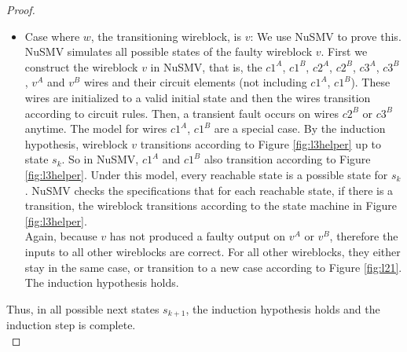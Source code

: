 \documentclass[12pt]{report}
\begin{document}
\begin{proof}
\begin{itemize}
\item Case where $w$, the transitioning wireblock, is $v$:  We use NuSMV to prove this.  NuSMV simulates all possible states of the faulty wireblock $v$.  First we construct the wireblock $v$ in NuSMV, that is, the $c1^A$, $c1^B$, $c2^A$, $c2^B$, $c3^A$, $c3^B$, $v^A$ and $v^B$ wires and their circuit elements (not including $c1^A$, $c1^B$).  These wires are initialized to a valid initial state and then the wires transition according to circuit rules.  Then, a transient fault occurs on wires $c2^B$ or $c3^B$ anytime.  The model for wires $c1^A$, $c1^B$ are a special case.  By the induction hypothesis, wireblock $v$ transitions according to Figure \ref{fig:l3helper} up to state $s_k$.  So in NuSMV, $c1^A$ and $c1^B$ also transition according to Figure \ref{fig:l3helper}.  Under this model, every reachable state is a possible state for $s_k$.
 NuSMV checks the specifications that for each reachable state, if there is a transition, the wireblock transitions according to the state machine in Figure \ref{fig:l3helper}.  \\
Again, because $v$ has not produced a faulty output on $v^A$ or $v^B$, therefore the inputs to all other wireblocks are correct.  For all other wireblocks, they either stay in the same case, or transition to a new case according to Figure \ref{fig:l21}.  The induction hypothesis holds.
\end{itemize}

Thus, in all possible next states $s_{k+1}$, the induction hypothesis holds and the induction step is complete. \\


\end{proof}
\end{document}
